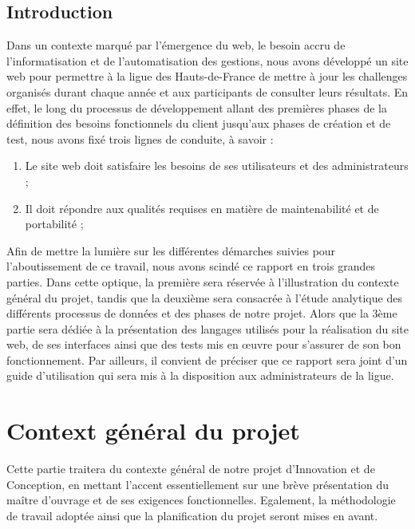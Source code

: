 \documentclass[12pt,a4paper]{report}
\begin{document}
	
	\newpage
	
	\tableofcontents
	
	\newpage
	
	\listoffigures
	
	\newpage
	\section*{Introduction}
	Dans un contexte marqué par l’émergence du web, le besoin accru de l’informatisation et de l’automatisation des gestions, nous avons développé un site web pour permettre à la ligue des Hauts-de-France de mettre à jour les challenges organisés durant chaque année et aux participants de consulter leurs résultats.
	En effet, le long du processus de développement allant des premières phases de la définition des besoins fonctionnels du client jusqu’aux phases de création et de test, nous avons fixé trois lignes de conduite, à savoir :
	\begin{enumerate}
	\item Le site web doit satisfaire les besoins de ses utilisateurs et des administrateurs ;
	\item Il doit répondre aux qualités requises en matière de maintenabilité et de portabilité ;
	\end{enumerate}
	Afin de mettre la lumière sur les différentes démarches suivies pour l’aboutissement de ce travail, nous avons scindé ce rapport en trois grandes parties. Dans cette optique, la première sera réservée à l’illustration du contexte général du projet, tandis que la deuxième sera consacrée à l’étude analytique des différents processus de données et des phases de notre projet. Alors que la 3ème partie sera dédiée à la présentation des langages utilisés pour la réalisation du site web, de ses interfaces ainsi que des tests mis en œuvre pour s’assurer de son bon fonctionnement. Par ailleurs, il convient de préciser que ce rapport sera joint d’un guide d’utilisation qui sera mis à la disposition aux administrateurs de la ligue.
	\chapter{Context général du projet}
	Cette partie traitera du contexte général de notre projet d’Innovation et de Conception, en mettant l’accent essentiellement sur une brève présentation du maître d'ouvrage et de ses exigences fonctionnelles. Egalement, la méthodologie de travail adoptée ainsi que la planification du projet seront mises en avant.  
	
\end{document}
